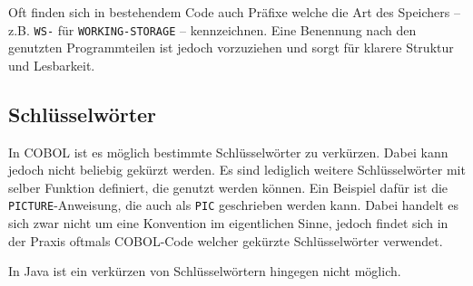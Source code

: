 Oft finden sich in bestehendem Code auch Präfixe welche die Art des Speichers -- z.B. \texttt{WS-} für \texttt{WORKING-STORAGE} -- kennzeichnen. Eine Benennung nach den genutzten Programmteilen ist jedoch vorzuziehen und sorgt für klarere Struktur und Lesbarkeit.


\subsection*{Schlüsselwörter}
In COBOL ist es möglich bestimmte Schlüsselwörter zu verkürzen. Dabei kann jedoch nicht beliebig gekürzt werden. Es sind lediglich weitere Schlüsselwörter mit selber Funktion definiert, die genutzt werden können. Ein Beispiel dafür ist die \texttt{PICTURE}-Anweisung, die auch als \texttt{PIC} geschrieben werden kann. Dabei handelt es sich zwar nicht um eine Konvention im eigentlichen Sinne, jedoch findet sich in der Praxis oftmals COBOL-Code welcher gekürzte Schlüsselwörter verwendet.

In Java ist ein verkürzen von Schlüsselwörtern hingegen nicht möglich.
